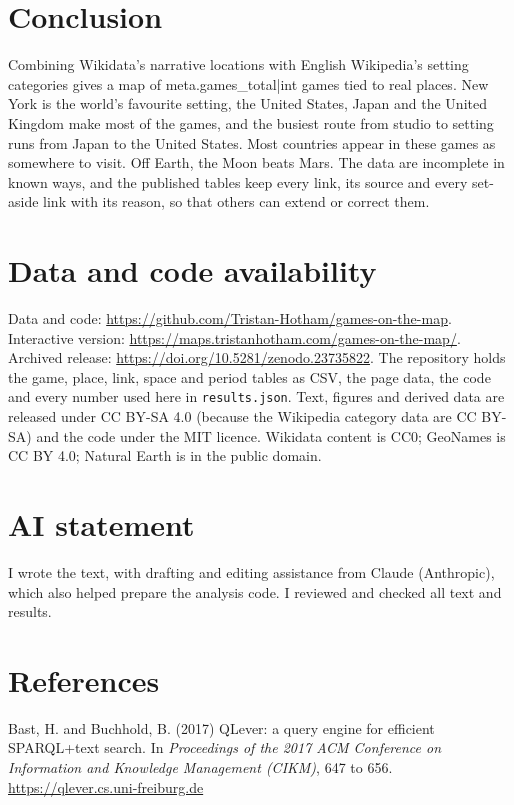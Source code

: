 \documentclass[11pt,a4paper]{article}
\begin{document}
\section{Conclusion}

Combining Wikidata's narrative locations with English Wikipedia's setting categories gives a map of {{meta.games_total|int}} games tied to real places. New York is the world's favourite setting, the United States, Japan and the United Kingdom make most of the games, and the busiest route from studio to setting runs from Japan to the United States. Most countries appear in these games as somewhere to visit. Off Earth, the Moon beats Mars. The data are incomplete in known ways, and the published tables keep every link, its source and every set-aside link with its reason, so that others can extend or correct them.

\section*{Data and code availability}

Data and code: \url{https://github.com/Tristan-Hotham/games-on-the-map}. Interactive version: \url{https://maps.tristanhotham.com/games-on-the-map/}. Archived release: \url{https://doi.org/10.5281/zenodo.23735822}. The repository holds the game, place, link, space and period tables as CSV, the page data, the code and every number used here in \texttt{results.json}. Text, figures and derived data are released under CC BY-SA 4.0 (because the Wikipedia category data are CC BY-SA) and the code under the MIT licence. Wikidata content is CC0; GeoNames is CC BY 4.0; Natural Earth is in the public domain.

\section*{AI statement}

I wrote the text, with drafting and editing assistance from Claude (Anthropic), which also helped prepare the analysis code. I reviewed and checked all text and results.

\section*{References}
\small
Bast, H. and Buchhold, B. (2017) QLever: a query engine for efficient SPARQL+text search. In \emph{Proceedings of the 2017 ACM Conference on Information and Knowledge Management (CIKM)}, 647 to 656. \url{https://qlever.cs.uni-freiburg.de}
\end{document}
